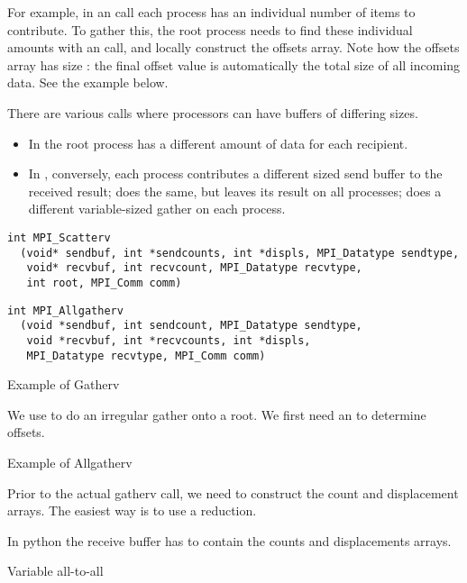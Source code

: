 For example, in an  call each process has an individual
number of items to contribute. To gather this, the root process needs
to find these individual amounts with an  call, and
locally construct the offsets array. Note how the offsets array has
size : the final offset value is automatically the total
size of all incoming data. See the example below.

There are various calls where processors can have
buffers of differing sizes.
\begin{itemize}
\item In  the root process has a different
  amount of data for each recipient.
\item In , conversely, each process
  contributes a different sized send buffer to the received result;
   does the same, but leaves its result
  on all processes;  does a different
  variable-sized gather on each process.
\end{itemize}

\begin{lstlisting}
int MPI_Scatterv
  (void* sendbuf, int *sendcounts, int *displs, MPI_Datatype sendtype, 
   void* recvbuf, int recvcount, MPI_Datatype recvtype, 
   int root, MPI_Comm comm)
\end{lstlisting}


\begin{lstlisting}
int MPI_Allgatherv
  (void *sendbuf, int sendcount, MPI_Datatype sendtype, 
   void *recvbuf, int *recvcounts, int *displs, 
   MPI_Datatype recvtype, MPI_Comm comm)
\end{lstlisting}

 {Example of Gatherv}

We use  to do an irregular gather onto a root. We first need an
 to determine offsets.
%
%

 {Example of Allgatherv}

Prior to the actual gatherv call, we need to construct the count and
displacement arrays. The easiest way is to use a reduction.


In python the receive buffer has to contain the counts and
displacements arrays.


 {Variable all-to-all}


